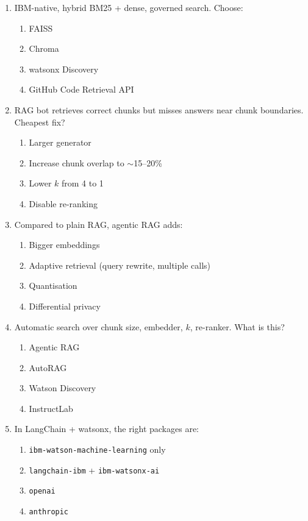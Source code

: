 \begin{enumerate}[leftmargin=*]
\item IBM-native, hybrid BM25 + dense, governed search. Choose:
\begin{enumerate}[label=\Alph*.]
  \item FAISS \item Chroma \item watsonx Discovery \item GitHub Code Retrieval API
\end{enumerate}

\item RAG bot retrieves correct chunks but misses answers near chunk boundaries. Cheapest fix?
\begin{enumerate}[label=\Alph*.]
  \item Larger generator \item Increase chunk overlap to $\sim$15--20\%
  \item Lower $k$ from 4 to 1 \item Disable re-ranking
\end{enumerate}

\item Compared to plain RAG, agentic RAG adds:
\begin{enumerate}[label=\Alph*.]
  \item Bigger embeddings \item Adaptive retrieval (query rewrite, multiple calls)
  \item Quantisation \item Differential privacy
\end{enumerate}

\item Automatic search over chunk size, embedder, $k$, re-ranker. What is this?
\begin{enumerate}[label=\Alph*.]
  \item Agentic RAG \item AutoRAG \item Watson Discovery \item InstructLab
\end{enumerate}

\item In LangChain + watsonx, the right packages are:
\begin{enumerate}[label=\Alph*.]
  \item \texttt{ibm-watson-machine-learning} only \item \texttt{langchain-ibm} + \texttt{ibm-watsonx-ai}
  \item \texttt{openai} \item \texttt{anthropic}
\end{enumerate}


\end{enumerate}
